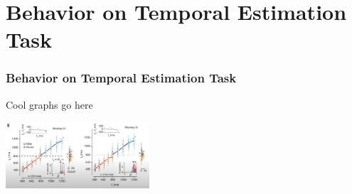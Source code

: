 \documentclass{beamer}
\begin{document}

\section{Behavior on Temporal Estimation Task}
\begin{frame}
\frametitle{\textbf{Behavior on Temporal Estimation Task} }

Cool graphs go here

\centering
\begin{minipage}{1\textwidth}
    \centering
    \includegraphics[width=0.4\textwidth]{images/Sohn_et_al-2019_03.PNG} %
\end{minipage}


\end{frame}

\end{document}
